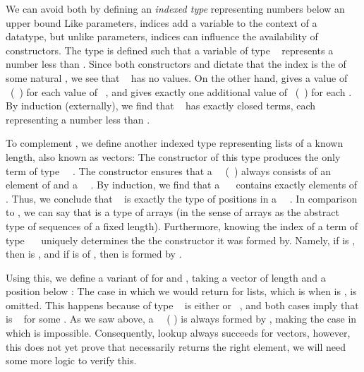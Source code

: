 We can avoid both by defining an \emph{indexed type} representing numbers below an upper bound
Like parameters, indices add a variable to the context of a datatype, but unlike parameters, indices can influence the availability of constructors. The type  is defined such that a variable of type \  represents a number less than .
Since both constructors  and  dictate that the index is the  of some natural , we see that \  has no values. On the other hand,  gives a value of \ (\ ) for each value of \ , and  gives exactly one additional value of \ (\ ) for each . By induction (externally), we find that \  has exactly  closed terms, each representing a number less than .

To complement , we define another indexed type representing lists of a known length, also known as vectors:
The \AIC{[]} constructor of this type produces the only term of type \ \ . The  constructor ensures that a \ \ (\ ) always consists of an element of  and a \ \ . By induction, we find that a \ \  contains exactly  elements of . Thus, we conclude that \  is exactly the type of positions in a \ \ . In comparison to , we can say that  is a type of arrays (in the sense of arrays as the abstract type of sequences of a fixed length). Furthermore, knowing the index of a term  of type \ \  uniquely determines the the constructor it was formed by. Namely, if  is , then  is \AIC{[]}, and if  is  of , then  is formed by . 

Using this, we define a variant of  for  and , taking a vector of length  and a position below :
The case in which we would return  for lists, which is when  is \AIC{[]}, is omitted. This happens because  of type \  is either  or \ , and both cases imply that  is \  for some . As we saw above, a \ \ ( ) is always formed by , making the case in which  is \AIC{[]} impossible. Consequently, lookup always succeeds for vectors,
however, this does not yet prove that  necessarily returns the right element, we will need some more logic to verify this.

